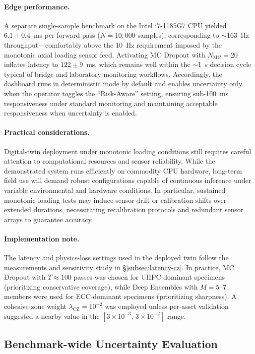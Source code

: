 \documentclass{article}
\begin{document}
\paragraph{Edge performance.}  
A separate single-sample benchmark on the Intel i7-1185G7 CPU yielded $6.1\pm0.4$~ms per forward pass ($N{=}10{,}000$ samples), corresponding to $\sim$163~Hz throughput—comfortably above the 10~Hz requirement imposed by the monotonic axial loading sensor feed. Activating MC Dropout with $N_{\mathrm{MC}}=20$ inflates latency to $122\pm9$~ms, which remains well within the $\sim$1~s decision cycle typical of bridge and laboratory monitoring workflows. Accordingly, the dashboard runs in deterministic mode by default and enables uncertainty only when the operator toggles the “Risk-Aware” setting, ensuring sub-100~ms responsiveness under standard monitoring and maintaining acceptable responsiveness when uncertainty is enabled.

\paragraph{Practical considerations.}  
Digital-twin deployment under monotonic loading conditions still requires careful attention to computational resources and sensor reliability. While the demonstrated system runs efficiently on commodity CPU hardware, long-term field use will demand robust configurations capable of continuous inference under variable environmental and hardware conditions. In particular, sustained monotonic loading tests may induce sensor drift or calibration shifts over extended durations, necessitating recalibration protocols and redundant sensor arrays to guarantee accuracy.  

\paragraph{Implementation note.}  
The latency and physics-loss settings used in the deployed twin follow the measurements and sensitivity study in \S\ref{subsec:latency-cz}. In practice, MC Dropout with $T{\approx}100$ passes was chosen for UHPC-dominant specimens (prioritizing conservative coverage), while Deep Ensembles with $M{=}5$--7 members were used for ECC-dominant specimens (prioritizing sharpness). A cohesive-zone weight $\lambda_{\mathrm{CZ}}=10^{-2}$ was employed unless per-asset validation suggested a nearby value in the $[3{\times}10^{-3},\,3{\times}10^{-2}]$ range.

\subsection{Benchmark-wide Uncertainty Evaluation}
\label{subsec:uq}
\end{document}
